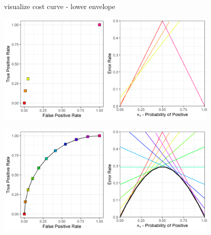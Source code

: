 \documentclass[11pt,compress,t,notes=noshow, xcolor=table]{beamer}
\begin{document}
\begin{frame}{visualize cost curve - lower envelope}
{\begin{center}
      \includegraphics[width=0.8\textwidth]{figure/lower_envelope_3.png}
    \end{center}
  }
   {
    \begin{center}
      \includegraphics[width=0.8\textwidth]{figure/lower_envelope_11.png}
    \end{center}
  }

\end{frame}
\end{document}

